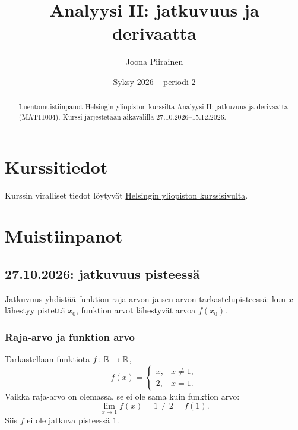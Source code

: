 \documentclass[11pt,a4paper]{amsart}
\title{Analyysi II: jatkuvuus ja derivaatta}
\author{Joona Piirainen}
\date{Syksy 2026 -- periodi 2}
\begin{document}
\begin{abstract}
  Luentomuistiinpanot Helsingin yliopiston kurssilta
  Analyysi II: jatkuvuus ja derivaatta (MAT11004).
  Kurssi järjestetään aikavälillä 27.10.2026--15.12.2026.
\end{abstract}

\maketitle

\tableofcontents

\section{Kurssitiedot}

Kurssin viralliset tiedot löytyvät
\href{https://studies.helsinki.fi/kurssit/opintojakso/otm-1adb0b8a-2fbd-4953-853f-8cdc614fa9ae/MAT11004}{Helsingin
yliopiston kurssisivulta}.

\section{Muistiinpanot}

\subsection{27.10.2026: jatkuvuus pisteessä}

Jatkuvuus yhdistää funktion raja-arvon ja sen arvon tarkastelupisteessä:
kun $x$ lähestyy pistettä $x_0$, funktion arvot lähestyvät arvoa $f(x_0)$.

\subsubsection*{Raja-arvo ja funktion arvo}

\begin{example}
  Tarkastellaan funktiota $f\colon\mathbb{R}\to\mathbb{R}$,
  \[
    f(x)=
    \begin{cases}
      x, & x\ne 1,\\
      2, & x=1.
    \end{cases}
  \]
  Vaikka raja-arvo on olemassa, se ei ole sama kuin funktion arvo:
  \[
    \lim_{x\to 1}f(x)=1\ne 2=f(1).
  \]
  Siis $f$ ei ole jatkuva pisteessä $1$.
\end{example}
\end{document}
